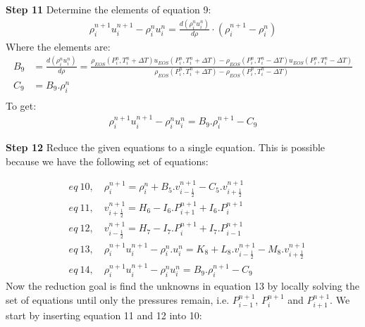 \documentclass[11pt,letterpaper,titlepage]{article}
\newcommand{\half}{\frac{1}{2}}
\begin{document}
\newpage \noindent
\textbf{Step 11}\newline
Determine the elements of equation 9:
\begin{equation*}
\begin{aligned}
 \rho_{i}^{n+1}u_{i}^{n+1} - \rho_{i}^{n}u_{i}^{n} = \frac{d(\rho_i^n u_i^{n})}{d\rho} \cdot (\rho_i^{n+1}-\rho_i^n)  
\end{aligned}
\end{equation*}
\newline
Where the elements are:
\begin{equation*}
\begin{aligned}
B_9&=\frac{d(\rho_i^n u_i^{n})}{d\rho}=\frac{\rho_{EOS}(P_i^n,T_i^n+\Delta T) u_{EOS}(P_i^n,T_i^n+\Delta T)-\rho_{EOS}(P_i^n,T_i^n-\Delta T) u_{EOS}(P_i^n,T_i^n-\Delta T)}{\rho_{EOS}(P_i^n,T_i^n+\Delta T)-\rho_{EOS}(P_i^n,T_i^n-\Delta T)} \\
C_9&=B_9.\rho_i^n \\
\end{aligned}
\end{equation*}
\newline
To get:
\begin{equation}
\begin{aligned}
\rho_{i}^{n+1}u_{i}^{n+1} - \rho_{i}^{n}u_{i}^{n} = B_9.\rho_{i}^{n+1}-C_9
\end{aligned}
\end{equation}







\newpage \noindent
\textbf{Step 12}\newline
Reduce the given equations to a single equation. This is possible because we have the following set of equations:

\begin{equation*}
\begin{aligned}
&eq \ 10, \quad \rho_i^{n+1}=\rho_i^{n}+B_5.v_{i-\half}^{n+1} - C_5.v_{i+\half}^{n+1}\\
&eq \ 11, \quad v_{i+\half}^{n+1}=H_6-I_6.P_{i+1}^{n+1}+I_6.P_{i}^{n+1} \\
&eq \ 12, \quad v_{i-\half}^{n+1}=H_7-I_7.P_{i}^{n+1}+I_7.P_{i-1}^{n+1} \\
&eq \ 13, \quad \rho_i^{n+1}u_i^{n+1}-\rho_i^{n}.u_i^{n}= K_8+L_8.v_{i-\half}^{n+1}-M_8.v_{i+\half}^{n+1}\\
&eq \ 14, \quad \rho_{i}^{n+1}u_{i}^{n+1} - \rho_{i}^{n}u_{i}^{n} = B_9.\rho_{i}^{n+1}-C_9
\end{aligned}
\end{equation*}
\newline
Now the reduction goal is find the unknowns in equation 13 by locally solving the set of equations until only the pressures remain, i.e. $P_{i-1}^{n+1}$, $P_{i}^{n+1}$ and $P_{i+1}^{n+1}$.
\newline
\newline
We start by inserting equation 11 and 12 into 10:
\end{document}
